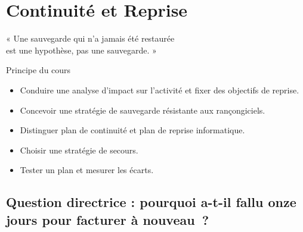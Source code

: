 
\chapter{Continuité et Reprise}
\label{chap:continuite}

\epigraph{%
    « Une sauvegarde qui n'a jamais été restaurée\\
    est une hypothèse, pas une sauvegarde. »%
}{Principe du cours}


\begin{boxobjectifs}
\begin{itemize}
    \item Conduire une analyse d'impact sur l'activité et fixer des
          objectifs de reprise.
    \item Concevoir une stratégie de sauvegarde résistante aux
          rançongiciels.
    \item Distinguer plan de continuité et plan de reprise informatique.
    \item Choisir une stratégie de secours.
    \item Tester un plan et mesurer les écarts.
\end{itemize}
\end{boxobjectifs}

\bigskip

\section*{Question directrice : pourquoi a-t-il fallu onze jours pour facturer à nouveau~?}

